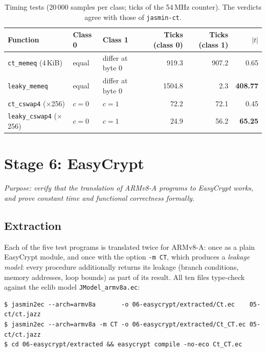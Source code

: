 \documentclass[11pt,a4paper]{article}
\newcommand{\file}[1]{\texttt{#1}}
\begin{document}
\begin{table}[h]
\centering\small
\begin{tabular}{@{}lllrrr@{}}
\toprule
\textbf{Function} & \textbf{Class 0} & \textbf{Class 1} & \textbf{Ticks (class 0)} & \textbf{Ticks (class 1)} & $|t|$ \\
\midrule
\texttt{ct\_memeq} (4\,KiB) & equal & differ at byte 0 & 919.3 & 907.2 & 0.65 \\
\texttt{leaky\_memeq} & equal & differ at byte 0 & 1504.8 & 2.3 & \textbf{408.77} \\
\texttt{ct\_cswap4} ($\times$256) & $c=0$ & $c=1$ & 72.2 & 72.1 & 0.45 \\
\texttt{leaky\_cswap4} ($\times$256) & $c=0$ & $c=1$ & 24.9 & 56.2 & \textbf{65.25} \\
\bottomrule
\end{tabular}
\caption{Timing tests (20\,000 samples per class; ticks of the 54\,MHz
counter). The verdicts agree with those of \texttt{jasmin-ct}.}
\end{table}

\section{Stage 6: EasyCrypt}
\label{sec:proofs}

\emph{Purpose: verify that the translation of ARMv8-A programs to EasyCrypt
works, and prove constant time and functional correctness formally.}

\subsection{Extraction}

Each of the five test programs is translated twice for ARMv8-A: once as a
plain EasyCrypt module, and once with the option \texttt{-m CT}, which
produces a \emph{leakage model}: every procedure additionally returns its
leakage (branch conditions, memory addresses, loop bounds) as part of its
result. All ten files type-check against the eclib model
\file{JModel\_armv8a.ec}:

\begin{lstlisting}[style=shell]
$ jasmin2ec --arch=armv8a       -o 06-easycrypt/extracted/Ct.ec    05-ct/ct.jazz
$ jasmin2ec --arch=armv8a -m CT -o 06-easycrypt/extracted/Ct_CT.ec 05-ct/ct.jazz
$ cd 06-easycrypt/extracted && easycrypt compile -no-eco Ct_CT.ec
\end{lstlisting}
\end{document}
